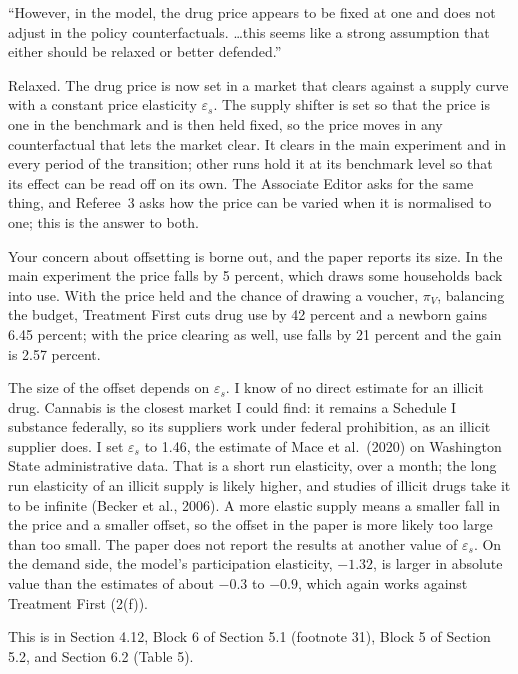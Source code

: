 \documentclass[11pt]{article}
\begin{document}
\begin{referee}
``However, in the model, the drug price appears to be fixed at one and does not
adjust in the policy counterfactuals. \dots this seems like a strong assumption
that either should be relaxed or better defended.''
\end{referee}
\begin{response}
Relaxed. The drug price is now set in a market that clears against a supply curve
with a constant price elasticity $\varepsilon_s$. The supply shifter is set so
that the price is one in the benchmark and is then held fixed, so the price moves
in any counterfactual that lets the market clear. It clears in the main
experiment and in every period of the transition; other runs hold it at its
benchmark level so that its effect can be read off on its own. The Associate
Editor asks for the same thing, and Referee~3 asks how the price can be varied
when it is normalised to one; this is the answer to both.

Your concern about offsetting is borne out, and the paper reports its size. In
the main experiment the price falls by 5 percent, which draws some households back
into use. With the price held and the chance of drawing a voucher, $\pi_V$,
balancing the budget, Treatment First cuts drug use by 42 percent and a newborn
gains 6.45 percent; with the price clearing as well, use falls by 21 percent and
the gain is 2.57 percent.

The size of the offset depends on $\varepsilon_s$. I know of no direct estimate
for an illicit drug. Cannabis is the closest market I could find: it remains a
Schedule I substance federally, so its suppliers work under federal prohibition,
as an illicit supplier does. I set $\varepsilon_s$ to 1.46, the estimate of Mace
et al.\ (2020) on Washington State administrative data. That is a short run
elasticity, over a month; the long run elasticity of an illicit supply is likely
higher, and studies of illicit drugs take it to be infinite (Becker et al.,
2006). A more elastic supply means a smaller fall in the price and a smaller
offset, so the offset in the paper is more likely too large than too small. The
paper does not report the results at another value of $\varepsilon_s$. On the
demand side, the model's participation elasticity, $-1.32$, is larger in absolute
value than the estimates of about $-0.3$ to $-0.9$, which again works against
Treatment First (2(f)).

This is in Section 4.12, Block 6 of Section 5.1 (footnote 31), Block 5 of Section
5.2, and Section 6.2 (Table 5).
\end{response}
\end{document}
